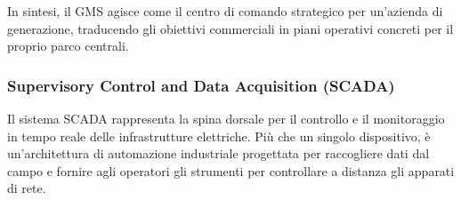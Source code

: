 In sintesi, il GMS agisce come il centro di comando strategico per un'azienda di generazione, traducendo gli obiettivi commerciali in piani operativi concreti per il proprio parco centrali.


\subsubsection{Supervisory Control and Data Acquisition (SCADA)}










Il sistema SCADA rappresenta la spina dorsale per il controllo e il monitoraggio in tempo reale delle infrastrutture elettriche. Più che un singolo dispositivo, è un'architettura di automazione industriale progettata per raccogliere dati dal campo e fornire agli operatori gli strumenti per controllare a distanza gli apparati di rete.

